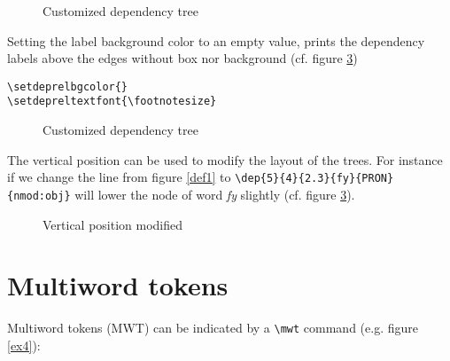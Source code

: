 \documentclass[12pt]{article}
\begin{document}
\setdepreltextfont{\it\scriptsize}
\setwordfont{\large\sf}
\setposfont{\rm\small}
\setbottomwordfont{\footnotesize\sf}
\setmwtfont{\it\scriptsize}



\begin{figure}[H]
\beispiel
\caption{Customized dependency tree}\label{ex2}
\end{figure}


Setting the label background color to an empty value, prints the dependency labels
above the edges without box nor background (cf. figure \ref{ex3})

\begin{verbatim}
\setdeprelbgcolor{}
\setdepreltextfont{\footnotesize}
\end{verbatim}


\setdeprelbgcolor{}
\setdepreltextfont{\footnotesize}
\begin{figure}[H]
\beispielNOPOS
\caption{Customized dependency tree}\label{ex3}
\end{figure}

The vertical position can be used to modify the layout of the
trees. For instance if we change the line from figure \ref{def1}
to \verb+\dep{5}{4}{2.3}{fy}{PRON}{nmod:obj}+
 will lower the node of
word \emph{fy} slightly (cf. figure \ref{ex3}).


\begin{figure}[H]
\caption{Vertical position modified}\label{ex3}
\end{figure}


\section{Multiword tokens}
Multiword tokens (MWT) can be indicated by a \verb:\mwt: command
(e.g. figure \ref{ex4}):
\end{document}
